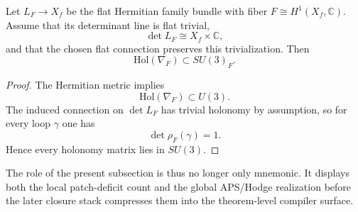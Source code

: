 \begin{proposition}
\label{prop:family-holonomy-su3}
Let $L_F\to X_f$ be the flat Hermitian family bundle with fiber
$F\cong H^1(X_f,\mathbb C)$. Assume that its determinant line is flat trivial,
\[
\det L_F \cong X_f\times \mathbb C,
\]
and that the chosen flat connection preserves this trivialization. Then
\[
\mathrm{Hol}(\nabla_F)\subset SU(3)_F.
\]
\end{proposition}

\begin{proof}
The Hermitian metric implies
\[
\mathrm{Hol}(\nabla_F)\subset U(3).
\]
The induced connection on $\det L_F$ has trivial holonomy by assumption, so for
every loop $\gamma$ one has
\[
\det \rho_F(\gamma)=1.
\]
Hence every holonomy matrix lies in $SU(3)$.
\end{proof}

The role of the present subsection is thus no longer only mnemonic. It displays both the local patch-deficit count and the global APS/Hodge realization before the later closure stack compresses them into the theorem-level compiler surface.

